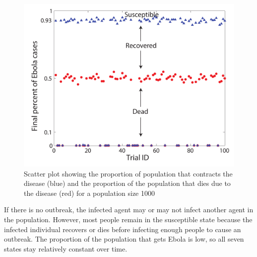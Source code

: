 \begin{figure}[h!]
\begin{center}
\includegraphics[scale=0.5]{N1000Scatter.pdf}
\end{center}
\caption{Scatter plot showing the proportion of population that contracts the disease (blue) and the proportion of the population that dies due to the disease (red) for a population size 1000 }%
\label{fig:Scatter}
\end{figure}


If there is no outbreak, the infected agent may or may not infect another agent in the population. However, most people remain in the  susceptible state because the infected individual recovers or dies before infecting enough people to cause an outbreak. The proportion of the population that gets Ebola is low, so all seven states stay relatively constant over time. %


